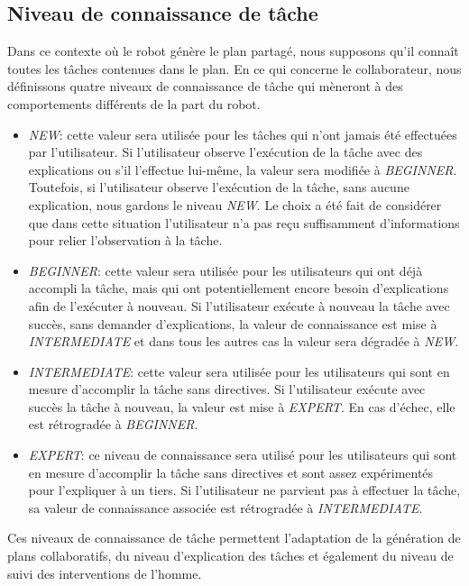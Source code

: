 \documentclass[a4paper,11pt,twoside]{StyleThese}
\begin{document}
\subsection{Niveau de connaissance de tâche}

Dans ce contexte où le robot génère le plan partagé, nous supposons qu'il connaît toutes les tâches contenues dans le plan.
En ce qui concerne le collaborateur, nous définissons quatre niveaux de connaissance de tâche qui mèneront à des comportements différents de la part du robot.

\begin{itemize}
\item \textit{NEW}: cette valeur sera utilisée pour les tâches qui n'ont jamais été effectuées par l'utilisateur. Si l'utilisateur observe l'exécution de la tâche avec des explications ou s'il l'effectue lui-même, la valeur sera modifiée à \textit{BEGINNER}.
Toutefois, si l'utilisateur observe l'exécution de la tâche, sans aucune explication, nous gardons le niveau \textit{NEW}. Le choix a été fait de considérer que dans cette situation l'utilisateur n'a pas reçu suffisamment d'informations pour relier l'observation à la tâche.
\item \textit{BEGINNER}: cette valeur sera utilisée pour les utilisateurs qui ont déjà accompli la tâche, mais qui ont potentiellement encore besoin d'explications afin de l'exécuter à nouveau. Si l'utilisateur exécute à nouveau la tâche avec succès, sans demander d'explications, la valeur de connaissance est mise à \textit{INTERMEDIATE} et dans tous les autres cas la valeur sera dégradée à \textit{NEW}.
\item \textit{INTERMEDIATE}: cette valeur sera utilisée pour les utilisateurs qui sont en mesure d'accomplir la tâche sans directives. Si l'utilisateur exécute avec succès la tâche à nouveau, la valeur est mise à \textit{EXPERT}. En cas d'échec, elle est rétrogradée à \textit{BEGINNER}.
\item \textit{EXPERT}: ce niveau de connaissance sera utilisé pour les utilisateurs qui sont en mesure d'accomplir la tâche sans directives et sont assez expérimentés pour l'expliquer à un tiers. Si l'utilisateur ne parvient pas à effectuer la tâche, sa valeur de connaissance associée est rétrogradée à \textit{INTERMEDIATE}.
\end{itemize}

Ces niveaux de connaissance de tâche permettent l'adaptation de la génération de plans collaboratifs, du niveau d'explication des tâches et également du niveau de suivi des interventions de l'homme.
\end{document}
